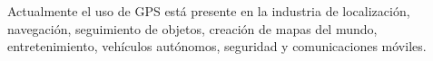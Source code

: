 \begin{itemize}
    Actualmente el uso de GPS está presente en la industria de localización, navegación, seguimiento de objetos, creación de mapas del mundo, entretenimiento, vehículos autónomos, seguridad y comunicaciones móviles.

\end{itemize}





